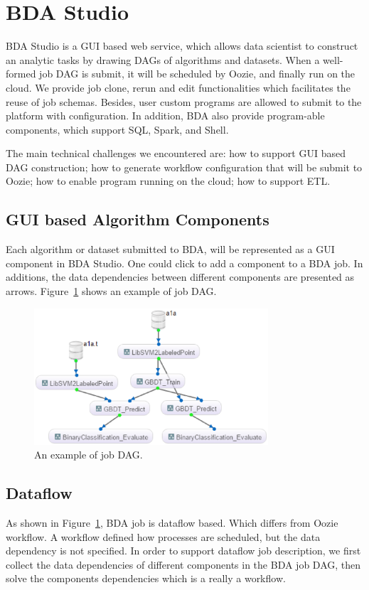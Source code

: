 \documentclass{sig-alternate-05-2015}
\begin{document}
\section{BDA Studio}
BDA Studio is a GUI based web service, which allows data scientist to construct an analytic tasks by drawing DAGs of algorithms and datasets. When a well-formed job DAG is submit, it will be scheduled by Oozie, and finally run on the cloud. We provide job clone, rerun and edit functionalities which facilitates the reuse of job schemas. Besides, user custom programs are allowed to submit to the platform with configuration. In addition, BDA also provide program-able components, which support SQL, Spark, and Shell. 

The main technical challenges we encountered are: how to support GUI based DAG construction; how to generate workflow configuration that will be submit to Oozie; how to enable program running on the cloud; how to support ETL.

\subsection{GUI based Algorithm Components}
Each algorithm or dataset submitted to BDA, will be represented as a GUI component in BDA Studio. One could click to add a component to a BDA job. In additions, the data dependencies between different components are presented as arrows. Figure~\ref{fig:dag} shows an example of job DAG.

\begin{figure}
\centering
\includegraphics[height=2in]{DAG.eps}
\caption{ An example of job DAG.}
\label{fig:dag}
\end{figure}

\subsection{Dataflow}
As shown in Figure~\ref{fig:dag}, BDA job is dataflow based. Which differs from Oozie workflow. A workflow defined how processes are scheduled, but the data dependency is not specified. In order to support dataflow job description, we first collect the data dependencies of different components in the BDA job DAG, then solve the components dependencies which is a really a workflow.
\end{document}
